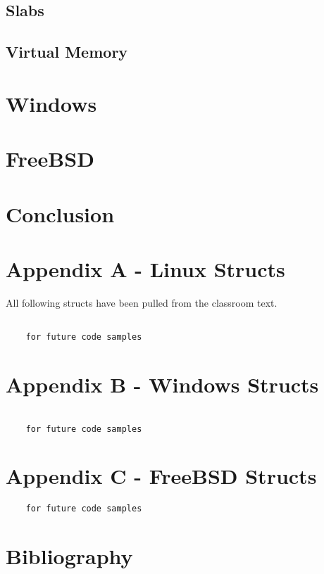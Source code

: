 \documentclass[10pt,letterpaper,onecolumn,draftclsnofoot]{IEEEtran}
\begin{document}
	

  \subsection{Slabs}
  \subsection{Virtual Memory}
  \section{Windows}
  \subsection{}
  \subsection{}
  \section{FreeBSD}
  \subsection{}
  \subsection{}
  \section{Conclusion}

  \clearpage
  \section{Appendix A - Linux Structs}
  All following structs have been pulled from the classroom text. \cite{robertlove2010}
  \begin{lstlisting}

    for future code samples

  \end{lstlisting}

  \section{Appendix B - Windows Structs}
  \begin{lstlisting}

    for future code samples
  \end{lstlisting}
  \section{Appendix C - FreeBSD Structs}
  \begin{lstlisting}
    for future code samples

  \end{lstlisting}

  \section{Bibliography}
  
  
\end{document}
